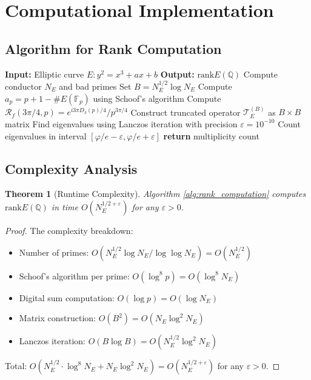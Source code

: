 \documentclass[12pt]{article}
\newcommand{\Q}{\mathbb{Q}}
\newcommand{\F}{\mathbb{F}}
\newcommand{\fractalres}{\mathcal{R}_f}
\newcommand{\goldenratio}{\varphi}
\newcommand{\digitalsum}{D_3}
\newcommand{\rk}{\text{rank}}
\newtheorem{theorem}{Theorem}[section]
\begin{document}
\section{Computational Implementation}

\subsection{Algorithm for Rank Computation}

\begin{algorithm}[H]
\caption{Fractal Rank Computation}
\label{alg:rank_computation}
\begin{algorithmic}[1]
\STATE \textbf{Input:} Elliptic curve $E: y^2 = x^3 + ax + b$
\STATE \textbf{Output:} $\rk E(\Q)$
\STATE
\STATE Compute conductor $N_E$ and bad primes
\STATE Set $B = N_E^{1/2} \log N_E$ 
    \STATE Compute $a_p = p + 1 - \#E(\F_p)$ using Schoof's algorithm
    \STATE Compute $\fractalres(3\pi/4, p) = e^{i3\pi\digitalsum(p)/4}/p^{3\pi/4}$
\ENDFOR
\STATE Construct truncated operator $\mathcal{T}_E^{(B)}$ as $B \times B$ matrix
\STATE Find eigenvalues using Lanczos iteration with precision $\varepsilon = 10^{-10}$
\STATE Count eigenvalues in interval $[\goldenratio/e - \varepsilon, \goldenratio/e + \varepsilon]$
\STATE \textbf{return} multiplicity count
\end{algorithmic}
\end{algorithm}

\subsection{Complexity Analysis}

\begin{theorem}[Runtime Complexity]
\label{thm:complexity}
Algorithm \ref{alg:rank_computation} computes $\rk E(\Q)$ in time $O(N_E^{1/2+\varepsilon})$ for any $\varepsilon > 0$.
\end{theorem}

\begin{proof}
The complexity breakdown:
\begin{itemize}
\item Number of primes: $O(N_E^{1/2} \log N_E / \log \log N_E) = O(N_E^{1/2})$
\item Schoof's algorithm per prime: $O(\log^8 p) = O(\log^8 N_E)$
\item Digital sum computation: $O(\log p) = O(\log N_E)$
\item Matrix construction: $O(B^2) = O(N_E \log^2 N_E)$
\item Lanczos iteration: $O(B \log B) = O(N_E^{1/2} \log^2 N_E)$
\end{itemize}

Total: $O(N_E^{1/2} \cdot \log^8 N_E + N_E \log^2 N_E) = O(N_E^{1/2+\varepsilon})$ for any $\varepsilon > 0$.
\end{proof}
\end{document}
